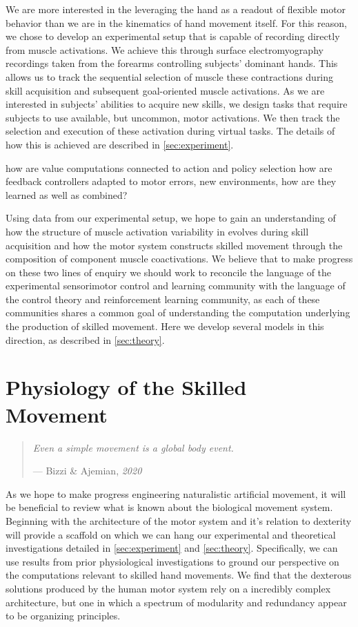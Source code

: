 \documentclass[
  a4paper,
]{article}
\begin{document}
We are more interested in the leveraging the hand as a readout of
flexible motor behavior than we are in the kinematics of hand movement
itself. For this reason, we chose to develop an experimental setup that
is capable of recording directly from muscle activations. We achieve
this through surface electromyography recordings taken from the forearms
controlling subjects' dominant hands. This allows us to track the
sequential selection of muscle these contractions during skill
acquisition and subsequent goal-oriented muscle activations. As we are
interested in subjects' abilities to acquire new skills, we design tasks
that require subjects to use available, but uncommon, motor activations.
We then track the selection and execution of these activation during
virtual tasks. The details of how this is achieved are described in
\cref{sec:experiment}.

how are value computations connected to action and policy selection how
are feedback controllers adapted to motor errors, new environments, how
are they learned as well as combined?

Using data from our experimental setup, we hope to gain an understanding
of how the structure of muscle activation variability in evolves during
skill acquisition and how the motor system constructs skilled movement
through the composition of component muscle coactivations. We believe
that to make progress on these two lines of enquiry we should work to
reconcile the language of the experimental sensorimotor control and
learning community with the language of the control theory and
reinforcement learning community, as each of these communities shares a
common goal of understanding the computation underlying the production
of skilled movement. Here we develop several models in this direction,
as described in \cref{sec:theory}.

\hypertarget{sec:physiology}{%
\section{Physiology of the Skilled Movement}\label{sec:physiology}}

\begin{quote}
\emph{Even a simple movement is a global body event.}

--- Bizzi \& Ajemian, \emph{2020}
\end{quote}

As we hope to make progress engineering naturalistic artificial
movement, it will be beneficial to review what is known about the
biological movement system. Beginning with the architecture of the motor
system and it's relation to dexterity will provide a scaffold on which
we can hang our experimental and theoretical investigations detailed in
\cref{sec:experiment} and \cref{sec:theory}. Specifically, we can use
results from prior physiological investigations to ground our
perspective on the computations relevant to skilled hand movements. We
find that the dexterous solutions produced by the human motor system
rely on a incredibly complex architecture, but one in which a spectrum
of modularity and redundancy appear to be organizing principles.
\end{document}

